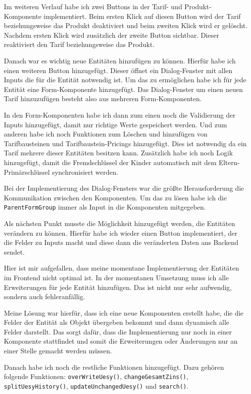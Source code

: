 Im weiteren Verlauf habe ich zwei Buttons in der Tarif- und Produkt-Komponente implementiert. Beim ersten Klick auf diesen Button wird der Tarif beziehungsweise das Produkt deaktiviert und beim zweiten Klick
wird er gelöscht. Nachdem ersten Klick wird zusätzlich der zweite Button sichtbar. Dieser reaktiviert den Tarif beziehungsweise das Produkt.

Danach war es wichtig neue Entitäten hinzufügen zu können. Hierfür habe ich einen weiteren Button hinzugefügt. Dieser öffnet ein Dialog-Fenster mit allen Inputs die für die Entität
notwendig ist. Um das zu ermöglichen habe ich für jede Entität eine Form-Komponente hinzugefügt. Das Dialog-Fenster um einen neuen Tarif hinzuzufügen besteht also aus mehreren 
Form-Komponenten. 

In den Form-Komponenten habe ich dann zum einen noch die Validierung der Inputs hinzugefügt, damit nur richtige Werte gespeichert werden. Und zum anderen habe ich noch Funktionen zum
Löschen und hinzufügen von Tarifbausteinen und Tarifbaustein-Pricings hinzugefügt. Dies ist notwendig da ein Tarif mehrere dieser Entitäten besitzen kann. Zusätzlich habe ich noch Logik hinzugefügt,
damit die Fremdschlüssel der Kinder automatisch mit dem Eltern-Primärschlüssel synchronisiert werden.

Bei der Implementierung des Dialog-Fensters war die größte Herausforderung die Kommunikation zwischen den Komponenten. Um das zu lösen habe ich die \texttt{ParentFormGroup} immer als Input in die 
Komponenten mitgegeben.

Als nächsten Punkt musste die Möglichkeit hinzugefügt werden, die Entitäten verändern zu können. Hierfür habe ich wieder einen Button 
implementiert, der die Felder zu Inputs macht und diese dann die veränderten Daten ans Backend sendet. 

Hier ist mir aufgefallen, dass meine momentane Implementierung der Entitäten im Frontend nicht optimal ist. In der momentanen Umsetzung
muss ich alle Erweiterungen für jede Entität hinzufügen. Das ist nicht nur sehr aufwendig, sondern auch fehleranfällig.

Meine Lösung war hierfür, dass ich eine neue Komponenten erstellt habe, die die Felder der Entität als Objekt übergeben bekommt und dann dynamisch
alle Felder darstellt. Das sorgt dafür, dass die Implementierung nur noch in einer Komponente stattfindet und somit die Erweiterungen oder Änderungen
nur an einer Stelle gemacht werden müssen.

Danach habe ich noch die restliche Funktionen hinzugefügt. Dazu gehören folgende Funktionen: \texttt{overWriteUesy()}, \texttt{changeGesamtZins()}, \texttt{splitUesyHistory()},
\texttt{updateUnchangedUesy()} und \texttt{search()}. 

